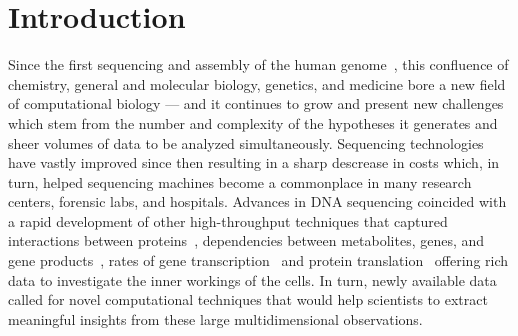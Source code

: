 \chapter{Introduction}



Since the first sequencing and assembly of the human genome~\cite{FirstHumanGenome}, this confluence of chemistry, general and molecular biology, genetics, and medicine bore a new field of computational biology --- and it continues to grow and present new challenges which stem from the number and complexity of the hypotheses it generates and sheer volumes of data to be analyzed simultaneously. Sequencing technologies have vastly improved since then resulting in a sharp descrease in costs which, in turn, helped sequencing machines become a commonplace in many research centers, forensic labs, and hospitals. Advances in DNA sequencing coincided with a rapid development of other high-throughput techniques that captured interactions between proteins~\cite{yeast2hybrid,TAPMS}, dependencies between metabolites, genes, and gene products~\cite{ChipSeq,GeneKnockouts}, rates of gene transcription~\cite{RNAseq} and protein translation~\cite{riboseq} offering rich data to investigate the inner workings of the cells. In turn, newly available data called for novel computational techniques that would help scientists to extract meaningful insights from these large multidimensional observations.


